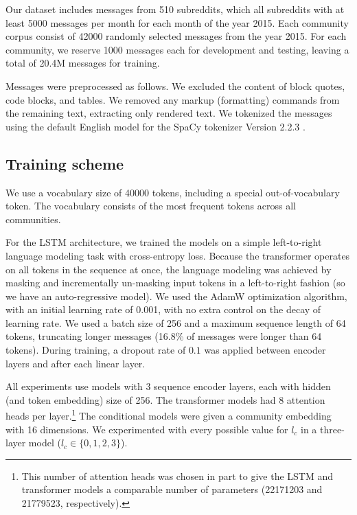 \documentclass[11pt]{article}
\begin{document}
Our dataset includes messages from \num{510} subreddits, 
which all subreddits 
with at least \num{5000} messages per month for each month
of the year 2015.
Each community corpus consist of \num{42000} randomly selected messages from the year 2015.
For each community, we reserve \num{1000} messages each for development and testing,
leaving a total of \num{20.4}M messages for training.

Messages were preprocessed as follows. 
We excluded the content of block quotes, code blocks, and tables.
We removed any markup (formatting) commands from the remaining text, 
extracting only rendered text.
We tokenized the messages using the default English model for the SpaCy tokenizer 
Version 2.2.3 \citep{Honnibal2017}.


\subsection{Training scheme}

We use a vocabulary size of \num{40000} tokens, including a special
out-of-vocabulary token.  The vocabulary consists of the most frequent
tokens across all communities.

For the LSTM architecture, we trained the models on a simple left-to-right language
modeling task with cross-entropy loss.  Because
the transformer operates on all tokens in the sequence at once, the
language modeling was achieved by masking and incrementally un-masking
input tokens in a left-to-right fashion (so we have an
auto-regressive model).  We used the AdamW
\citep{Loshchilov2019} optimization algorithm, with an initial
learning rate of \num{0.001}, with no extra control on the decay
of learning rate.
%
We used a batch size of \num{256} and a maximum sequence length of
\num{64} tokens, truncating longer messages (16.8\% of messages were
longer than \num{64} tokens).  During training, a dropout rate of
$0.1$ was applied between encoder layers and after each linear layer.

All experiments use models with \num{3} sequence encoder layers,
each with hidden (and token embedding) size of \num{256}. 
The transformer models had \num{8} attention heads per layer.\footnote{
  This number of attention heads was chosen in part to give the LSTM and transformer
  models a comparable number of parameters 
  (\num{22171203} and \num{21779523}, respectively).}
The conditional models were given a community embedding with \num{16} dimensions. 
We experimented with every possible value for $l_c$ in a three-layer model ($l_c\in\{0,1,2,3\}$).
\end{document}
